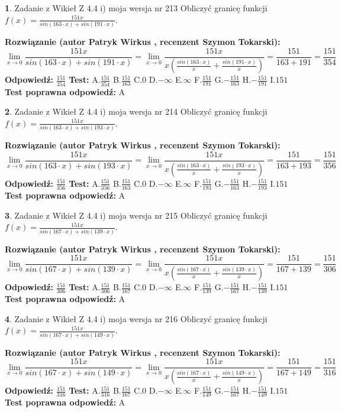 \documentclass[12pt, a4paper]{article}
\theoremstyle{definition} %
\newtheorem{zad}{}
\newcommand{\zadStart}[1]{\begin{zad}#1\newline}
\newcommand{\zadStop}{\end{zad}}
\newcommand{\rozwStart}[2]{\noindent \textbf{Rozwiązanie (autor #1 , recenzent #2): }\newline}
\newcommand{\rozwStop}{\newline}
\newcommand{\odpStart}{\noindent \textbf{Odpowiedź:}\newline}
\newcommand{\odpStop}{\newline}
\newcommand{\testStart}{\noindent \textbf{Test:}\newline}
\newcommand{\testStop}{\newline}
\newcommand{\kluczStart}{\noindent \textbf{Test poprawna odpowiedź:}\newline}
\newcommand{\kluczStop}{\newline}
\begin{document}
\zadStart{Zadanie z Wikieł Z 4.4 i) moja wersja nr 213}
Obliczyć granicę funkcji $f(x)=\frac{151x}{sin(163\cdot x) +sin(191\cdot x)}$.
\zadStop
\rozwStart{Patryk Wirkus}{Szymon Tokarski}
$$\lim\limits_{x\to 0}\frac{151x}{sin(163\cdot x) +sin(191\cdot x)}=\lim\limits_{x\to 0}\frac{151x}{x(\frac{sin(163\cdot x)}{x}+\frac{sin(191\cdot x)}{x})}=\frac{151}{163+191} = \frac{151}{354}$$
\rozwStop
\odpStart
$\frac{151}{354}$
\odpStop
\testStart
A.$\frac{151}{354}$
B.$\frac{151}{163}$
C.$0$
D.$-\infty$
E.$\infty$
F.$\frac{151}{191}$
G.$-\frac{151}{163}$
H.$-\frac{151}{191}$
I.$151$
\testStop
\kluczStart
A
\kluczStop



\zadStart{Zadanie z Wikieł Z 4.4 i) moja wersja nr 214}
Obliczyć granicę funkcji $f(x)=\frac{151x}{sin(163\cdot x) +sin(193\cdot x)}$.
\zadStop
\rozwStart{Patryk Wirkus}{Szymon Tokarski}
$$\lim\limits_{x\to 0}\frac{151x}{sin(163\cdot x) +sin(193\cdot x)}=\lim\limits_{x\to 0}\frac{151x}{x(\frac{sin(163\cdot x)}{x}+\frac{sin(193\cdot x)}{x})}=\frac{151}{163+193} = \frac{151}{356}$$
\rozwStop
\odpStart
$\frac{151}{356}$
\odpStop
\testStart
A.$\frac{151}{356}$
B.$\frac{151}{163}$
C.$0$
D.$-\infty$
E.$\infty$
F.$\frac{151}{193}$
G.$-\frac{151}{163}$
H.$-\frac{151}{193}$
I.$151$
\testStop
\kluczStart
A
\kluczStop



\zadStart{Zadanie z Wikieł Z 4.4 i) moja wersja nr 215}
Obliczyć granicę funkcji $f(x)=\frac{151x}{sin(167\cdot x) +sin(139\cdot x)}$.
\zadStop
\rozwStart{Patryk Wirkus}{Szymon Tokarski}
$$\lim\limits_{x\to 0}\frac{151x}{sin(167\cdot x) +sin(139\cdot x)}=\lim\limits_{x\to 0}\frac{151x}{x(\frac{sin(167\cdot x)}{x}+\frac{sin(139\cdot x)}{x})}=\frac{151}{167+139} = \frac{151}{306}$$
\rozwStop
\odpStart
$\frac{151}{306}$
\odpStop
\testStart
A.$\frac{151}{306}$
B.$\frac{151}{167}$
C.$0$
D.$-\infty$
E.$\infty$
F.$\frac{151}{139}$
G.$-\frac{151}{167}$
H.$-\frac{151}{139}$
I.$151$
\testStop
\kluczStart
A
\kluczStop



\zadStart{Zadanie z Wikieł Z 4.4 i) moja wersja nr 216}
Obliczyć granicę funkcji $f(x)=\frac{151x}{sin(167\cdot x) +sin(149\cdot x)}$.
\zadStop
\rozwStart{Patryk Wirkus}{Szymon Tokarski}
$$\lim\limits_{x\to 0}\frac{151x}{sin(167\cdot x) +sin(149\cdot x)}=\lim\limits_{x\to 0}\frac{151x}{x(\frac{sin(167\cdot x)}{x}+\frac{sin(149\cdot x)}{x})}=\frac{151}{167+149} = \frac{151}{316}$$
\rozwStop
\odpStart
$\frac{151}{316}$
\odpStop
\testStart
A.$\frac{151}{316}$
B.$\frac{151}{167}$
C.$0$
D.$-\infty$
E.$\infty$
F.$\frac{151}{149}$
G.$-\frac{151}{167}$
H.$-\frac{151}{149}$
I.$151$
\testStop
\kluczStart
A
\kluczStop
\end{document}
